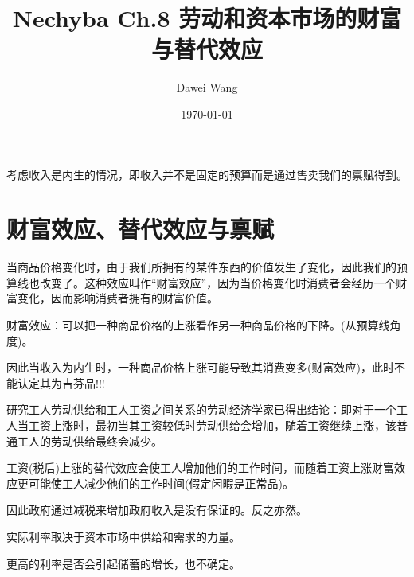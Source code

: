\documentclass{article}
\title{Nechyba Ch.8 劳动和资本市场的财富与替代效应}
\author{Dawei Wang}
\date{\today}
\begin{document}
	\maketitle
考虑收入是内生的情况，即收入并不是固定的预算而是通过售卖我们的禀赋得到。

\section{财富效应、替代效应与禀赋}
当商品价格变化时，由于我们所拥有的某件东西的价值发生了变化，因此我们的预算线也改变了。这种效应叫作“财富效应”，因为当价格变化时消费者会经历一个财富变化，因而影响消费者拥有的财富价值。

\hspace*{\fill}

财富效应：可以把一种商品价格的上涨看作另一种商品价格的下降。(从预算线角度)。

因此当收入为内生时，一种商品价格上涨可能导致其消费变多(财富效应)，此时不能认定其为吉芬品!!!

\hspace*{\fill}

研究工人劳动供给和工人工资之间关系的劳动经济学家已得出结论：即对于一个工人当工资上涨时，最初当其工资较低时劳动供给会增加，随着工资继续上涨，该普通工人的劳动供给最终会减少。

工资(税后)上涨的替代效应会使工人增加他们的工作时间，而随着工资上涨财富效应更可能使工人减少他们的工作时间(假定闲暇是正常品)。

因此政府通过减税来增加政府收入是没有保证的。反之亦然。

\hspace*{\fill}

实际利率取决于资本市场中供给和需求的力量。

更高的利率是否会引起储蓄的增长，也不确定。
\end{document}
